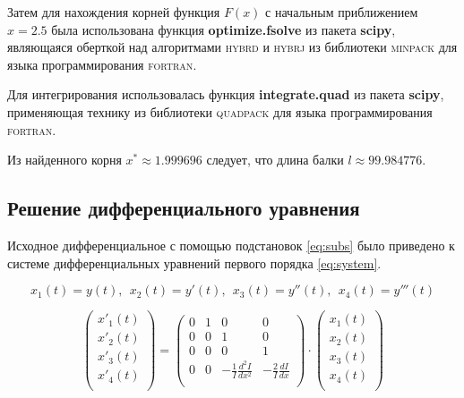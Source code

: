 Затем для нахождения корней функция $F(x)$ с начальным приближением $x = 2.5$ была использована функция \textbf{optimize.fsolve} из пакета \textbf{scipy}, являющаяся оберткой над алгоритмами \textsc{hybrd} и \textsc{hybrj} из библиотеки \textsc{minpack} для языка программирования \textsc{fortran}. 

Для интегрирования использовалась функция \textbf{integrate.quad} из пакета \textbf{scipy}, применяющая технику из библиотеки \textsc{quadpack} для языка программирования \textsc{fortran}.

Из найденного корня $x^* \approx 1.999696$ следует, что длина балки 
$l \approx 99.984776$.

\subsection{Решение дифференциального уравнения}\label{section:solve}

Исходное дифференциальное с помощью подстановок \ref{eq:subs} было приведено к системе дифференциальных уравнений первого порядка \ref{eq:system}.

\begin{equation}\label{eq:subs}
x_1(t) = y(t),\ \ x_2(t) = y'(t),\ \ x_3(t) = y''(t),\ \ x_4(t) = y'''(t)
\end{equation}

\begin{equation}\label{eq:system}
\begin{pmatrix}
    x'_1(t) \\
    x'_2(t) \\
    x'_3(t) \\
    x'_4(t) \\
\end{pmatrix} =
\begin{pmatrix}
    0 & 1 & 0 & 0 \\
    0 & 0 & 1 & 0 \\
    0 & 0 & 0 & 1 \\
    0 & 0 & - \frac{1}{I} \frac{d^2I}{dx^2} & - \frac{2}{I} \frac{dI}{dx} \\
\end{pmatrix}
\cdot
\begin{pmatrix}
    x_1(t) \\
    x_2(t) \\
    x_3(t) \\
    x_4(t) \\
\end{pmatrix}
\end{equation}

